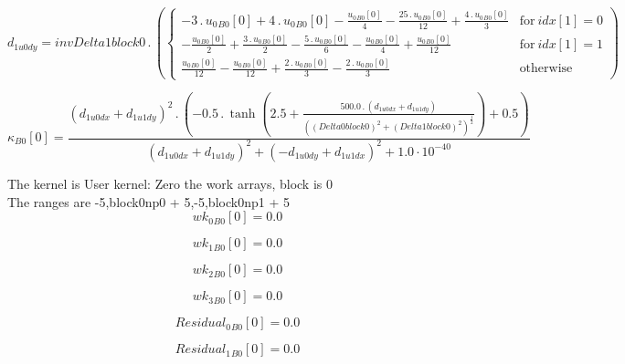 \documentclass{article}
\begin{document}
\begin{dmath}d_{1 u0 dy} = invDelta1block0 \,.\, \left(\begin{cases} - 3 \,.\, {u_{0}{_{B0}}}[{0}] + 4 \,.\, {u_{0}{_{B0}}}[{0}] - \frac{{u_{0}{_{B0}}}[{0}]}{4} - \frac{25 \,.\, {u_{0}{_{B0}}}[{0}]}{12} + \frac{4 \,.\, {u_{0}{_{B0}}}[{0}]}{3} & 
\text{for}\: {idx}[{1}] = 0 \\- \frac{{u_{0}{_{B0}}}[{0}]}{2} + \frac{3 \,.\, {u_{0}{_{B0}}}[{0}]}{2} - \frac{5 \,.\, {u_{0}{_{B0}}}[{0}]}{6} - \frac{{u_{0}{_{B0}}}[{0}]}{4} + \frac{{u_{0}{_{B0}}}[{0}]}{12} & \text{for}\: {idx}[{1}] = 1 
\\\frac{{u_{0}{_{B0}}}[{0}]}{12} - \frac{{u_{0}{_{B0}}}[{0}]}{12} + \frac{2 \,.\, {u_{0}{_{B0}}}[{0}]}{3} - \frac{2 \,.\, {u_{0}{_{B0}}}[{0}]}{3} & \text{otherwise} \end{cases}\right)\end{dmath}

\begin{dmath}{\kappa{_{B0}}}[{0}] = \frac{\left(d_{1 u0 dx} + d_{1 u1 dy} \right)^{2} \,.\, \left(- 0.5 \,.\, \tanh{\left (2.5 + \frac{500.0 \,.\, \left(d_{1 u0 dx} + d_{1 u1 dy}\right)}{\left(\left(Delta0block0 \right)^{2} + \left(Delta1block0 
\right)^{2} \right)^{\frac{1}{2}}} \right )} + 0.5\right)}{\left(d_{1 u0 dx} + d_{1 u1 dy} \right)^{2} + \left(- d_{1 u0 dy} + d_{1 u1 dx} \right)^{2} + 1.0 \cdot 10^{-40}}\end{dmath}

\noindent The kernel is User kernel: Zero the work arrays, block is 0\\\noindent The ranges are -5,block0np0 + 5,-5,block0np1 + 5\\\begin{dmath}{wk_{0}{_{B0}}}[{0}] = 0.0\end{dmath}

\begin{dmath}{wk_{1}{_{B0}}}[{0}] = 0.0\end{dmath}

\begin{dmath}{wk_{2}{_{B0}}}[{0}] = 0.0\end{dmath}

\begin{dmath}{wk_{3}{_{B0}}}[{0}] = 0.0\end{dmath}

\begin{dmath}{Residual_{0}{_{B0}}}[{0}] = 0.0\end{dmath}

\begin{dmath}{Residual_{1}{_{B0}}}[{0}] = 0.0\end{dmath}
\end{document}
